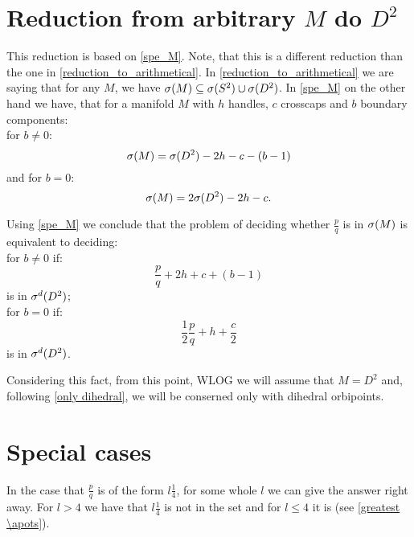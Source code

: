 \section{Reduction from arbitrary $M$ do $D^2$}
This reduction is based on \ref{spe_M}.
Note, that this is a different reduction than the one in \ref{reduction_to_arithmetical}. 
In \ref{reduction_to_arithmetical} we are saying that for any $M$, we have ${{\sigma}(M)} 
\subseteq {{\sigma}(S^2)} \cup {{\sigma}(D^2)}$. In \ref{spe_M} on the other hand we have, that 
for a manifold $M$ with $h$ handles, $c$ crosscaps and $b$ boundary components: \\
for $b \neq 0$:
\begin{equation}
{\sigma}(M) = {{\sigma}(D^2)} - 2h - c - (b - 1)
\end{equation}
and for $b = 0$:
\begin{equation}
{\sigma}(M) = 2{{\sigma}(D^2)} - 2h - c.
\end{equation}  


Using \ref{spe_M} 
we conclude that the problem of deciding whether $\frac{p}{q}$ is in ${\sigma}(M)$
is equivalent to deciding: \\
for $b \neq 0$ if:
\begin{equation}
\frac{p}{q} + 2h + c + (b-1) 
\end{equation} 
is in ${\sigma^d(D^2)}$; \\
for $b = 0$ if:
\begin{equation}
\frac{1}{2}\frac{p}{q}+h+\frac{c}{2}
\end{equation}
is in ${\sigma^d(D^2)}$.

Considering this fact, from this point, WLOG we will assume that $M = D^2$ and, 
following \ref{only dihedral}, we will 
be conserned only with dihedral orbipoints.


\section{Special cases}
In the case that $\frac{p}{q}$ is of the form $l\frac{1}{4}$, for some whole $l$ 
we can give the answer right away. For $l > 4$ we have that $l\frac{1}{4}$ is not in the set 
and for $l \leq 4$ it is (see \ref{greatest \apots}). 


